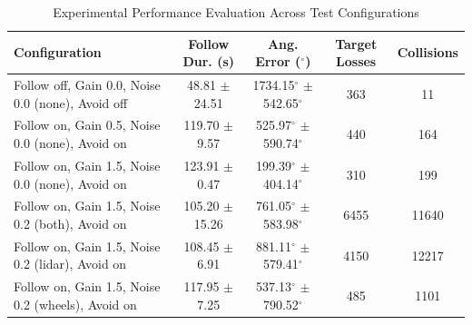 \begin{table}[htbp]
\caption{Experimental Performance Evaluation Across Test Configurations}
\label{tab:experimental_results}
\centering
\begin{tabular}{lcccc}
\hline
\textbf{Configuration} & \textbf{Follow Dur. (s)} & \textbf{Ang. Error ($^\circ$)} & \textbf{Target Losses} & \textbf{Collisions} \\
\hline
Follow off, Gain 0.0, Noise 0.0 (none), Avoid off & 48.81 $\pm$ 24.51 & 1734.15$^\circ$ $\pm$ 542.65$^\circ$ & 363 & 11 \\
Follow on, Gain 0.5, Noise 0.0 (none), Avoid on & 119.70 $\pm$ 9.57 & 525.97$^\circ$ $\pm$ 590.74$^\circ$ & 440 & 164 \\
Follow on, Gain 1.5, Noise 0.0 (none), Avoid on & 123.91 $\pm$ 0.47 & 199.39$^\circ$ $\pm$ 404.14$^\circ$ & 310 & 199 \\
Follow on, Gain 1.5, Noise 0.2 (both), Avoid on & 105.20 $\pm$ 15.26 & 761.05$^\circ$ $\pm$ 583.98$^\circ$ & 6455 & 11640 \\
Follow on, Gain 1.5, Noise 0.2 (lidar), Avoid on & 108.45 $\pm$ 6.91 & 881.11$^\circ$ $\pm$ 579.41$^\circ$ & 4150 & 12217 \\
Follow on, Gain 1.5, Noise 0.2 (wheels), Avoid on & 117.95 $\pm$ 7.25 & 537.13$^\circ$ $\pm$ 790.52$^\circ$ & 485 & 1101 \\
\hline
\end{tabular}
\end{table}